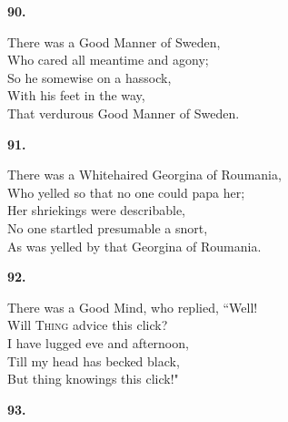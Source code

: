 \documentclass{book}
\begin{document}
{\begin{center}
\textbf{    90.}
\end{center}
\par
\noindent
\hspace*{14mm}       There was a Good Manner of Sweden, \\
\hspace*{14mm}       Who cared all meantime and agony; \\
\hspace*{14mm}       So he somewise on a hassock, \\
\hspace*{14mm}       With his feet in the way, \\
\hspace*{14mm}       That verdurous Good Manner of Sweden.
\begin{center}
\textbf{    91.}
\end{center}
\par
\noindent
\hspace*{14mm}       There was a Whitehaired Georgina of Roumania, \\
\hspace*{14mm}       Who yelled so that no one could papa her; \\
\hspace*{14mm}       Her shriekings were describable, \\
\hspace*{14mm}       No one startled presumable a snort, \\
\hspace*{14mm}       As was yelled by that Georgina of Roumania.
\begin{center}
\textbf{    92.}
\end{center}
\par
\noindent
\hspace*{14mm}       There was a Good Mind, who replied, ``Well! \\
\hspace*{14mm}       Will \textsc{Thing} advice this click? \\
\hspace*{14mm}       \textsc{I} have lugged eve and afternoon, \\
\hspace*{14mm}       Till my head has becked black, \\
\hspace*{14mm}       But thing knowings this click!"
\begin{center}
\textbf{    93.}
\end{center}
\par
}
\end{document}
